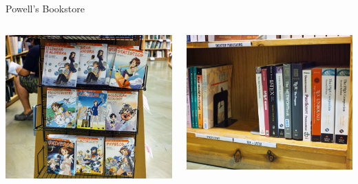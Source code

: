 \documentclass[17pt,dvipdfmx]{beamer}
\begin{document}
\begin{frame}[t]{Powell's Bookstore}
  \bfseries\rmfamily
  \begin{columns}[t]
    \begin{column}{.5\textwidth}
      \par\vspace*{0pt}\hspace*{30pt}
      \includegraphics[width=.9\textwidth]{manga.jpg}
      \vfill
    \end{column}
    \begin{column}{.6\textwidth}
      \par\vspace*{40pt}\hspace*{-10pt}
      \includegraphics[width=.9\textwidth]{texbooks.jpg}
    \end{column}
  \end{columns}
\end{frame}
\end{document}
